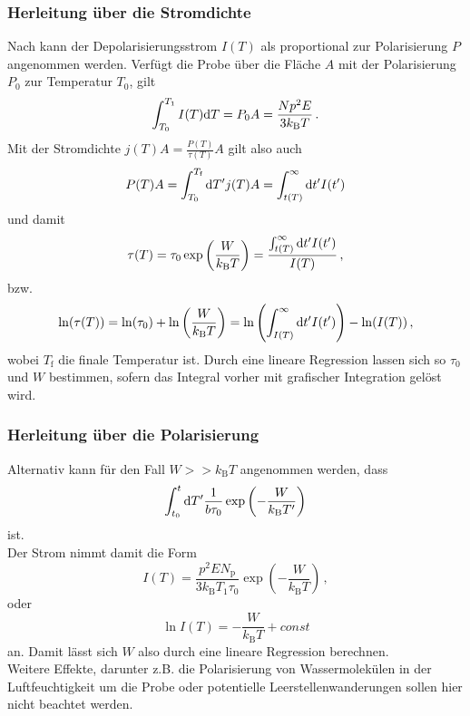 \subsubsection{Herleitung über die Stromdichte}

Nach \cite[S. ~4]{fuller} kann der Depolarisierungsstrom $I(T)$ als proportional zur Polarisierung $P$ angenommen werden.
Verfügt die Probe über die Fläche $A$ mit der Polarisierung $P_0$ zur Temperatur $T_0$, gilt
\begin{equation*}
    \int^{T_1}_{T_0} I(T) \mathrm{d} T = P_0 A = \frac{N p^2 E}{3 k_\text{B}T} \,.
\end{equation*}
Mit der Stromdichte $j(T) A = \frac{P(T)}{\tau(T)} A$ gilt also auch
\begin{equation*}
    P(T) A = \int^{T_\text{f}}_{T_0} \mathrm{d} T' j(T) A  = \int^\infty_{t(T)} \mathrm{d} t' I(t')
\end{equation*}
und damit
\begin{equation}
    \tau(T) = \tau_0 \exp \left(\frac{W}{k_\text{B} T} \right) =  \frac{\int^\infty_{t(T)} \mathrm{d} t' I(t')}{I(T)} \,,
    \label{eq:relaxozeitpol}
\end{equation}
bzw.
\begin{equation}
    \ln(\tau(T)) = \ln(\tau_0) + \ln\left(\frac{W}{k_\text{B} T} \right) =  \ln \left(\int^\infty_{I(T)} \mathrm{d} t' I(t') \right) - \ln (I(T)) \,,
    \label{eq:lnrelaxozeitpol}
\end{equation}
wobei $T_\text{f}$ die finale Temperatur ist.
Durch eine lineare Regression lassen sich so $\tau_0$ und $W$ bestimmen, sofern das Integral vorher mit grafischer Integration gelöst wird.

\subsubsection{Herleitung über die Polarisierung}

Alternativ kann für den Fall $W >> k_\text{B} T$ angenommen werden, dass
\begin{equation*}
    \int^t_{t_0} \mathrm{d} T' \frac{1}{b \tau_0}  \exp \left(-\frac{W}{k_\text{B} T'} \right)
\end{equation*}
ist. \\
Der Strom nimmt damit die Form
\begin{equation*}
    I(T) = \frac{p^2 E N_\text{p}}{3 k_\text{B} T_1 \tau_0} \exp(-\frac{W}{k_\text{B} T}) \, ,
\end{equation*}
oder
\begin{equation}
    \ln I(T) = - \frac{W}{k_\text{B} T} + const
    \label{eq:lnStrom}
\end{equation}
an.
Damit lässt sich $W$ also durch eine lineare Regression berechnen. \\

Weitere Effekte, darunter z.B. die Polarisierung von Wassermolekülen in der Luftfeuchtigkeit um die Probe oder potentielle Leerstellenwanderungen sollen hier nicht beachtet werden.



